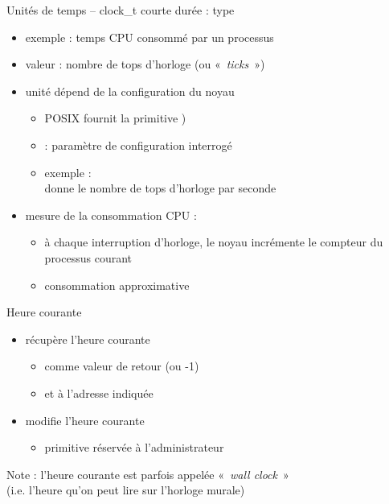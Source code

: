 \begin {frame} {Unités de temps -- clock\_t}
    courte durée : type 

    \begin {itemize}
	\item exemple : temps CPU consommé par un processus
	\item valeur : nombre de tops d'horloge (ou «~\textit {ticks}~»)
	\item unité dépend de la configuration du noyau
	    \begin {itemize}
		\item POSIX fournit la primitive
		    )
		\item {} : paramètre de configuration interrogé
		\item exemple : 
		    \\
		    \implique donne le nombre de tops d'horloge par seconde
	    \end {itemize}
	\item mesure de la consommation CPU :
	    \begin {itemize}
		\item à chaque interruption d'horloge, le noyau incrémente
		    le compteur du processus courant
		\item \implique consommation approximative
	    \end {itemize}
    \end {itemize}
\end {frame}



\begin {frame} {Heure courante}

    \begin {itemize}
	\item {} récupère l'heure courante
	    \begin {itemize}
		\item comme valeur de retour (ou -1)
		\item et à l'adresse indiquée
	    \end {itemize}
	\item {} modifie l'heure courante
	    \begin {itemize}
		\item primitive réservée à l'administrateur
	    \end {itemize}
    \end {itemize}

    \vspace* {3mm}

    Note : l'heure courante est parfois appelée «~\textit {wall clock}~» \\
    (i.e. l'heure qu'on peut lire sur l'horloge murale)
\end {frame}


